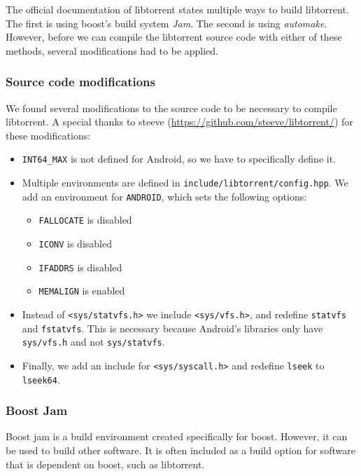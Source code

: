 		The official documentation of libtorrent states multiple ways to build libtorrent. The first is using boost's build system \emph{Jam}. The second is using \emph{automake}. However, before we can compile the libtorrent source code with either of these methods, several modifications had to be applied.
		
		\subsubsection{Source code modifications}
				
		We found several modifications to the source code to be necessary to compile libtorrent. A special thanks to steeve (\url{https://github.com/steeve/libtorrent/}) for these modifications:
		
		\begin{itemize}
		\item \texttt{INT64\_MAX} is not defined for Android, so we have to specifically define it.
		\item Multiple environments are defined in \texttt{include/libtorrent/config.hpp}. We add an environment for \texttt{ANDROID}, which sets the following options:
			\begin{itemize}
				\item \texttt{FALLOCATE} is disabled
				\item \texttt{ICONV} is disabled
				\item \texttt{IFADDRS} is disabled
				\item \texttt{MEMALIGN} is enabled
			\end{itemize}
		\item Instead of \texttt{<sys/statvfs.h>} we include \texttt{<sys/vfs.h>}, and redefine \texttt{statvfs} and \texttt{fstatvfs}. This is necessary because Android's libraries only have \texttt{sys/vfs.h} and not \texttt{sys/statvfs}.
		\item Finally, we add an include for \texttt{<sys/syscall.h>} and redefine \texttt{lseek} to \texttt{lseek64}.
		\end{itemize}
		
		\subsubsection{Boost Jam}
		Boost jam is a build environment created specifically for boost. However, it can be used to build other software. It is often included as a build option for software that is dependent on boost, such as libtorrent.
		
